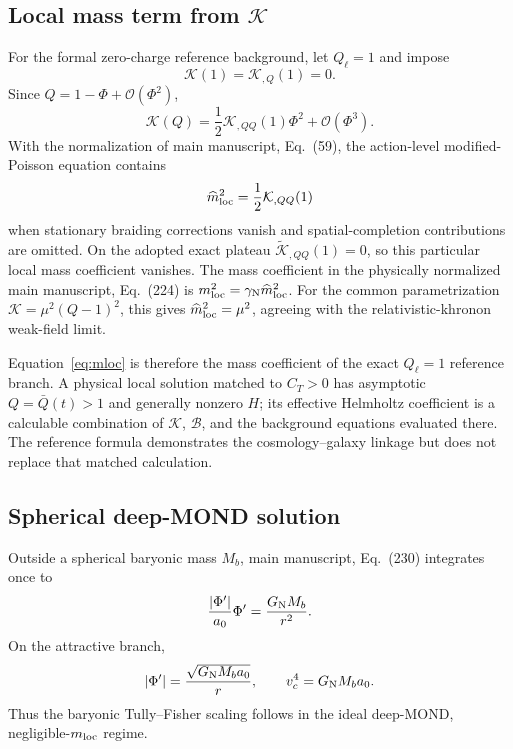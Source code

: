 \documentclass[aps,prd,reprint,onecolumn,notitlepage,nofootinbib,longbibliography,floatfix]{revtex4-2}
\theoremstyle{scstyle}
\theoremstyle{definition}
\theoremstyle{remark}
\newcommand{\cK}{\mathcal K}
\newcommand{\cB}{\mathcal B}
\newcommand{\cO}{\mathcal O}
\newcommand{\Kt}{\widetilde{\mathcal K}}
\begin{document}
\subsection{Local mass term from \texorpdfstring{$\cK$}{K}}

For the formal zero-charge reference background, let $Q_\ell=1$ and impose
\begin{equation}
\cK(1)=\cK_{,Q}(1)=0.
\label{eq:localKzero}
\end{equation}
Since $Q=1-\Phi+\cO(\Phi^2)$,
\begin{equation}
\cK(Q)=\frac12\cK_{,QQ}(1)\Phi^2+\cO(\Phi^3).
\label{eq:Kweakexpand}
\end{equation}
With the normalization of main manuscript, Eq.~(59), the action-level modified-Poisson equation contains
\begin{equation}
\widehat m_{\rm loc}^2=\frac12\cK_{,QQ}(1)
\label{eq:mloc}
\end{equation}
when stationary braiding corrections vanish and spatial-completion contributions are omitted. On the adopted exact plateau $\Kt_{,QQ}(1)=0$, so this particular local mass coefficient vanishes. The mass coefficient in the physically normalized main manuscript, Eq.~(224) is $m_{\rm loc}^2=\gamma_{\rm N}\widehat m_{\rm loc}^2$. For the common parametrization $\cK=\mu^2(Q-1)^2$, this gives $\widehat m_{\rm loc}^2=\mu^2$, agreeing with the relativistic-khronon weak-field limit.

Equation~\eqref{eq:mloc} is therefore the mass coefficient of the exact $Q_\ell=1$ reference branch. A physical local solution matched to $C_T>0$ has asymptotic $Q=\bar Q(t)>1$ and generally nonzero $H$; its effective Helmholtz coefficient is a calculable combination of $\cK$, $\cB$, and the background equations evaluated there. The reference formula demonstrates the cosmology--galaxy linkage but does not replace that matched calculation.

\subsection{Spherical deep-MOND solution}

Outside a spherical baryonic mass $M_b$, main manuscript, Eq.~(230) integrates once to
\begin{equation}
\frac{|\Phi'|}{a_0}\Phi'
=\frac{G_{\rm N}M_b}{r^2}.
\label{eq:sphericalmond}
\end{equation}
On the attractive branch,
\begin{equation}
|\Phi'|=\frac{\sqrt{G_{\rm N}M_ba_0}}{r},
\qquad
v_c^4=G_{\rm N}M_ba_0.
\label{eq:BTFR}
\end{equation}
Thus the baryonic Tully--Fisher scaling follows in the ideal deep-MOND, negligible-$m_{\rm loc}$ regime. 
\end{document}
